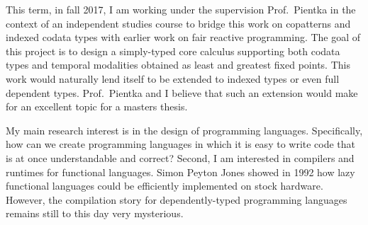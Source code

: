 \documentclass[11pt,letterpaper]{article}
\begin{document}
This term, in fall 2017, I am working under the supervision Prof.~Pientka in
the context of an independent studies course to bridge this work on copatterns
and indexed codata types with earlier work on fair reactive
programming\footnotemark.
The goal of this project is to design a simply-typed core calculus supporting
both codata types and temporal modalities obtained as least and greatest fixed
points.
This work would naturally lend itself to be extended to indexed types or even
full dependent types. Prof.~Pientka and I believe that such an extension would
make for an excellent topic for a masters thesis.
%
%

My main research interest is in the design of programming languages.
Specifically, how can we create programming languages in which it is easy to
write code that is at once understandable and correct?
Second, I am interested in compilers and runtimes for functional languages.
Simon Peyton Jones showed in 1992 how lazy functional languages could be
efficiently implemented on stock hardware. However, the compilation story for
dependently-typed programming languages remains still to this day very
mysterious.
\end{document}
